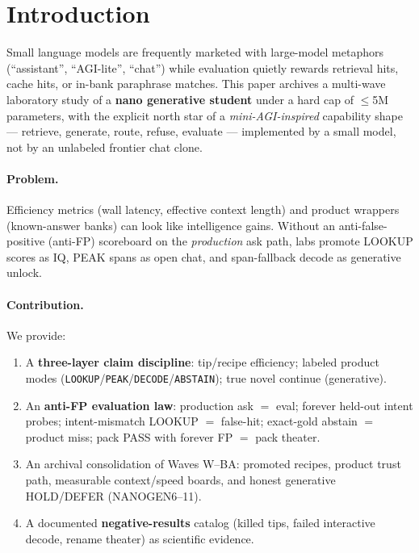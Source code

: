 \section{Introduction}
\label{sec:introduction}

Small language models are frequently marketed with large-model metaphors
(``assistant'', ``AGI-lite'', ``chat'') while evaluation quietly rewards
retrieval hits, cache hits, or in-bank paraphrase matches.
This paper archives a multi-wave laboratory study of a \textbf{nano generative
student} under a hard cap of $\leq$5M parameters, with the explicit north star of
a \emph{mini-AGI-inspired} capability shape --- retrieve, generate, route, refuse,
evaluate --- implemented by a small model, not by an unlabeled frontier chat clone.

\paragraph{Problem.}
Efficiency metrics (wall latency, effective context length) and product wrappers
(known-answer banks) can look like intelligence gains.
Without an anti-false-positive (anti-FP) scoreboard on the \emph{production} ask
path, labs promote LOOKUP scores as IQ, PEAK spans as open chat, and span-fallback
decode as generative unlock.

\paragraph{Contribution.}
We provide:
\begin{enumerate}
  \item A \textbf{three-layer claim discipline}: tip/recipe efficiency; labeled
        product modes (\texttt{LOOKUP}/\texttt{PEAK}/\texttt{DECODE}/\texttt{ABSTAIN});
        true novel continue (generative).
  \item An \textbf{anti-FP evaluation law}: production ask $=$ eval; forever
        held-out intent probes; intent-mismatch LOOKUP $=$ false-hit; exact-gold
        abstain $=$ product miss; pack PASS with forever FP $=$ pack theater.
  \item An archival consolidation of Waves W--BA: promoted recipes, product
        trust path, measurable context/speed boards, and honest generative
        HOLD/DEFER (NANOGEN6--11).
  \item A documented \textbf{negative-results} catalog (killed tips, failed
        interactive decode, rename theater) as scientific evidence.
\end{enumerate}

